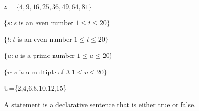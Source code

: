 $z = \{4,9,16,25,36,49,64,81\}$



$\{ s : s $ is an even number $ 1 \leq t \leq 20 \}$

$\{ t : t $ is an even number $ 1 \leq t \leq 20 \}$

$\{ u : u $ is a prime number $ 1 \leq u \leq 20 \}$

$\{ v : v $ is a multiple of 3 $ 1 \leq v \leq 20 \}$






U=\{2,4,6,8,10,12,15\}


A statement is a declarative sentence that is either true or false.
